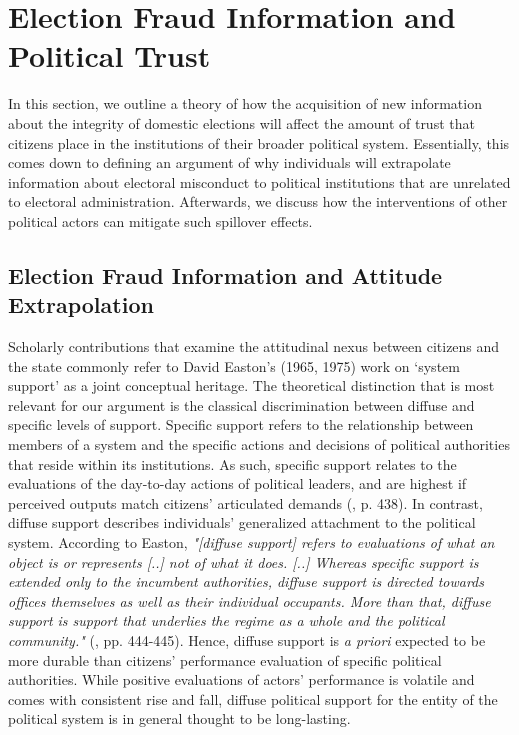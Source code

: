 \documentclass[11pt, ngerman,english,a4]{article}
\begin{document}
\section*{Election Fraud Information and Political Trust}

In this section, we outline a theory of how the acquisition of new information about the integrity of domestic elections will affect the amount of trust that citizens place in the institutions of their broader political system. Essentially, this comes down to defining an argument of why individuals will extrapolate information about electoral misconduct to political institutions that are unrelated to electoral administration. Afterwards, we discuss how the interventions of other political actors can mitigate such spillover effects.

\subsection*{Election Fraud Information and Attitude Extrapolation}

Scholarly contributions that examine the attitudinal nexus between citizens and the state commonly refer to David Easton's (1965, 1975) work on ‘system support' as a joint conceptual heritage. The theoretical distinction that is most relevant for our argument is the classical discrimination between diffuse and specific levels of support. Specific support refers to the relationship between members of a system and the specific actions and decisions of political authorities that reside within its institutions. As such, specific support relates to the evaluations of the day-to-day actions of political leaders, and are highest if perceived outputs match citizens' articulated demands (\citealt{Easton1975}, p. 438). In contrast, diffuse support describes individuals' generalized attachment to the political system. According to Easton, \textit{"[diffuse support] refers to evaluations of what an object is or represents [..] not of what it does. [..] Whereas specific support is extended only to the incumbent authorities, diffuse support is directed towards offices themselves as well as their individual occupants. More than that, diffuse support is support that underlies the regime as a whole and the political community."} (\citealt{Easton1975}, pp. 444-445). Hence, diffuse support is \textit{a priori} expected to be more durable than citizens' performance evaluation of specific political authorities. While positive evaluations of actors' performance is volatile and comes with consistent rise and fall, diffuse political support for the entity of the political system is in general thought to be long-lasting. 
\end{document}
